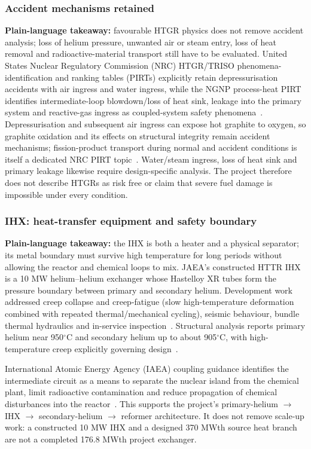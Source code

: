 \subsubsection{Accident mechanisms retained}
\textbf{Plain-language takeaway:} favourable HTGR physics does not remove accident analysis; loss of helium pressure, unwanted air or steam entry, loss of heat removal and radioactive-material transport still have to be evaluated. United States Nuclear Regulatory Commission (NRC) HTGR/TRISO phenomena-identification and ranking tables (PIRTs) explicitly retain depressurisation accidents with air ingress and water ingress, while the NGNP process-heat PIRT identifies intermediate-loop blowdown/loss of heat sink, leakage into the primary system and reactive-gas ingress as coupled-system safety phenomena~\cite{nrctriso6844,nrcngnppirt2010}. Depressurisation and subsequent air ingress can expose hot graphite to oxygen, so graphite oxidation and its effects on structural integrity remain accident mechanisms; fission-product transport during normal and accident conditions is itself a dedicated NRC PIRT topic~\cite{nrcngnpfpt2008}. Water/steam ingress, loss of heat sink and primary leakage likewise require design-specific analysis. The project therefore does not describe HTGRs as risk free or claim that severe fuel damage is impossible under every condition.

\subsubsection{IHX: heat-transfer equipment and safety boundary}
\textbf{Plain-language takeaway:} the IHX is both a heater and a physical separator; its metal boundary must survive high temperature for long periods without allowing the reactor and chemical loops to mix. JAEA's constructed HTTR IHX is a 10 MW helium--helium exchanger whose Hastelloy XR tubes form the pressure boundary between primary and secondary helium. Development work addressed creep collapse and creep-fatigue (slow high-temperature deformation combined with repeated thermal/mechanical cycling), seismic behaviour, bundle thermal hydraulics and in-service inspection~\cite{hamamoto2006ihx}. Structural analysis reports primary helium near 950$^\circ$C and secondary helium up to about 905$^\circ$C, with high-temperature creep explicitly governing design~\cite{httrihx1995}.

International Atomic Energy Agency (IAEA) coupling guidance identifies the intermediate circuit as a means to separate the nuclear island from the chemical plant, limit radioactive contamination and reduce propagation of chemical disturbances into the reactor~\cite{iaeanuclearhydrogen2013}. This supports the project's primary-helium $\rightarrow$ IHX $\rightarrow$ secondary-helium $\rightarrow$ reformer architecture. It does not remove scale-up work: a constructed 10 MW IHX and a designed 370 MWth source heat branch are not a completed 176.8 MWth project exchanger.


